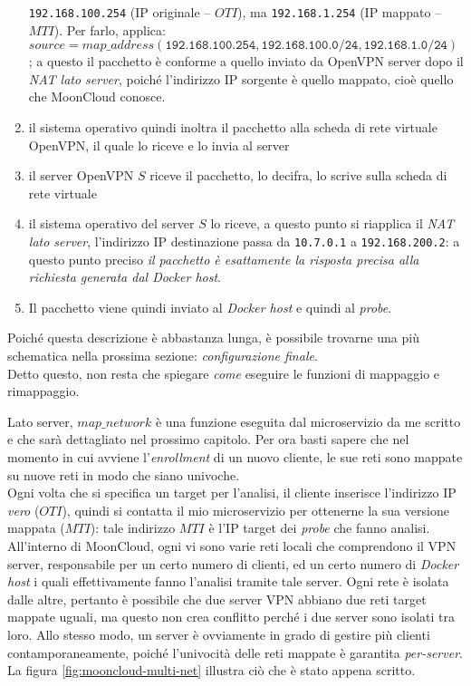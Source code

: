 \begin{enumerate}
  \texttt{192.168.100.254} (IP originale -- $OTI$), ma \texttt{192.168.1.254}
  (IP mappato -- $MTI$). Per farlo, applica:
  $source=map\_address(\texttt{192.168.100.254}, \texttt{192.168.100.0/24}, \texttt{192.168.1.0/24})$
  ; a questo il pacchetto è conforme a quello inviato da OpenVPN server dopo il
  \textit{NAT lato server}, poiché l'indirizzo IP sorgente è quello mappato, cioè quello
  che MoonCloud conosce.
  \item il sistema operativo quindi inoltra il pacchetto alla scheda di rete virtuale
  OpenVPN, il quale lo riceve e lo invia al server
  \item il server OpenVPN $S$ riceve il pacchetto, lo decifra, lo scrive sulla scheda di rete
  virtuale
  \item il sistema operativo del server $S$ lo riceve, a questo punto si riapplica
  il \textit{NAT lato server}, l'indirizzo IP destinazione passa da \texttt{10.7.0.1}
  a \texttt{192.168.200.2}: a questo punto preciso \textit{il pacchetto è esattamente
  la risposta precisa alla richiesta generata dal Docker host}.
  \item Il pacchetto viene quindi inviato al \textit{Docker host} e quindi al \textit{probe}.
\end{enumerate}
Poiché questa descrizione è abbastanza lunga, è possibile trovarne una più schematica
nella prossima sezione: \textit{configurazione finale}.\\
Detto questo, non resta che spiegare \textit{come} eseguire le funzioni di mappaggio
e rimappaggio.


Lato server, $map\_network$ è una funzione eseguita dal microservizio da me scritto
e che sarà dettagliato nel prossimo capitolo. Per ora basti sapere che nel momento
in cui avviene l'\textit{enrollment} di un nuovo cliente, le sue reti sono mappate
su nuove reti in modo che siano univoche.\\
Ogni volta che si specifica un target per l'analisi, il cliente inserisce l'indirizzo IP
\textit{vero} ($OTI$), quindi si contatta il mio microservizio per ottenerne
la sua versione mappata ($MTI$): tale indirizzo $MTI$ è l'IP target dei \textit{probe}
che fanno analisi.\\
All'interno di MoonCloud, ogni vi sono varie reti locali che comprendono il VPN server,
responsabile per un certo numero di clienti, ed un certo numero di \textit{Docker host}
i quali effettivamente fanno l'analisi tramite tale server. Ogni rete è isolata
dalle altre, pertanto è possibile che due server VPN abbiano due reti target mappate
uguali, ma questo non crea conflitto perché i due server sono isolati tra loro.
Allo stesso modo, un server è ovviamente in grado di gestire più clienti
contamporaneamente, poiché l'univocità delle reti mappate è garantita \textit{per-server}.
La figura \ref{fig:mooncloud-multi-net} illustra ciò che è stato appena scritto.


